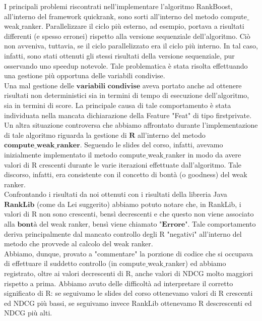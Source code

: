 I principali problemi riscontrati nell'implementare l'algoritmo RankBoost, all'interno del framework quickrank, sono sorti all'interno del metodo compute$\_$weak$\_$ranker. Parallelizzare il ciclo più esterno, ad esempio, portava a risultati differenti (e spesso erronei) rispetto alla versione sequenziale dell'algoritmo. Ciò non avveniva, tuttavia, se il ciclo parallelizzato era il ciclo più interno. In tal caso, infatti, sono stati ottenuti gli stessi risultati della versione sequenziale, pur osservando uno speedup notevole. Tale problematica è stata risolta effettuando una gestione più opportuna delle variabili condivise.\\
Una mal gestione delle $\textbf{variabili condivise}$ aveva portato anche ad ottenere risultati non deterministici sia in termini di tempo di esecuzione dell'algoritmo, sia in termini di score. La principale causa di tale comportamento è stata individuata nella mancata dichiarazione della Feature "Feat" di tipo firstprivate.\\
Un altra situazione controversa che abbiamo affrontato durante l'implementazione di tale algoritmo riguarda la gestione di $\textbf{R}$ all'interno del metodo $\textbf{compute}\_\textbf{weak}\_\textbf{ranker}$. Seguendo le slides del corso, infatti, avevamo inizialmente implementato il metodo compute$\_$weak$\_$ranker in modo da avere valori di R crescenti durante le varie iterazioni effettuate dall'algoritmo. Tale discorso, infatti, era consistente con il concetto di bontà (o goodness) del weak ranker.\\
Confrontando i risultati da noi ottenuti con i risultati della libreria Java $\textbf{RankLib}$ (come da Lei suggerito) abbiamo potuto notare che, in RankLib, i valori di R non sono crescenti, bensì decrescenti e che questo non viene associato alla $\textbf{bontà}$ del weak ranker, bensì viene chiamato $\textbf{"Errore"}$. Tale comportamento deriva principalmente dal mancato controllo degli R "negativi" all'interno del metodo che provvede al calcolo del weak ranker.\\
Abbiamo, dunque, provato a "commentare" la porzione di codice che si occupava di effettuare il suddetto controllo (in compute$\_$weak$\_$ranker) ed abbiamo registrato, oltre ai valori decrescenti di R, anche valori di NDCG molto maggiori rispetto a prima. Abbiamo avuto delle difficoltà ad interpretare il corretto significato di R: se seguivamo le slides del corso ottenevamo valori di R crescenti ed NDCG più bassi, se seguivamo invece RankLib ottenevamo R descrescenti ed NDCG più alti.\\
